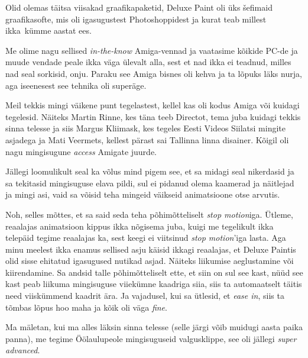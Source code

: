 Olid olemas täitsa viisakad graafikapaketid, Deluxe Paint oli üks šefimaid graafikasofte, mis oli igasugustest Photoshoppidest ja kurat teab millest ikka kümme aastat ees. 

Me olime nagu sellised \emph{in-the-know} Amiga-vennad ja vaatasime  kõikide PC-de  ja muude vendade peale ikka väga ülevalt alla, sest et nad ikka ei teadnud, milles nad seal sorkisid, onju. Paraku see Amiga bisnes oli kehva ja ta lõpuks läks nurja, aga iseenesest see tehnika oli superäge. 

Meil tekkis mingi väikene punt tegelastest, kellel kas oli kodus Amiga või kuidagi tegelesid. Näiteks Martin Rinne, kes täna teeb Directot, tema juba kuidagi tekkis   sinna telesse ja siis Margus Kliimask, kes tegeles Eesti Videos Siilatsi mingite asjadega ja Mati Veermets, kellest pärast sai Tallinna linna  disainer.  Kõigil oli nagu mingisugune \emph{access} Amigate juurde. 

Jällegi loomulikult seal ka võlus mind pigem see, et sa midagi seal nikerdasid ja sa tekitasid mingisuguse elava pildi, sul ei  pidanud olema kaamerad ja näitlejad ja mingi asi, vaid sa võisid teha mingeid väikseid  animatsioone otse arvutis.


Noh, selles mõttes, et sa said seda teha põhimõtteliselt \emph{stop motion}iga. Ütleme,  reaalajas animatsioon kippus ikka nõgisema juba, kuigi me tegelikult ikka telepäid tegime reaalajas ka, sest keegi ei viitsinud \emph{stop motion}'iga lasta. Aga minu meelest ikka enamus sellised asju käisid ikkagi reaalajas, et Deluxe Paintis olid sisse ehitatud igasugused nutikad asjad. Näiteks  liikumise aeglustamine või kiirendamine. Sa andsid talle põhimõtteliselt ette, et siin on sul see kast, nüüd see kast peab liikuma mingisuguse viiekümne kaadriga siia, siis ta automaatselt täitis need viiskümmend kaadrit ära. Ja vajadusel, kui sa ütlesid, et \emph{ease in}, siis ta tõmbas lõpus hoo maha ja kõik oli väga \emph{fine}.  

Ma mäletan, kui ma alles läksin sinna telesse (selle järgi võib muidugi aasta paika panna), me tegime Öölaulupeole  mingisuguseid valgusklippe, see oli jällegi \emph{super advanced}.

